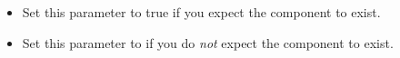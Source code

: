 
\begin{itemize}
\item Set this parameter to true if you expect the component to exist.
\item Set this parameter to \gdrefbooleanfalse if you do \emph{not} expect the component to exist.
\end{itemize}
